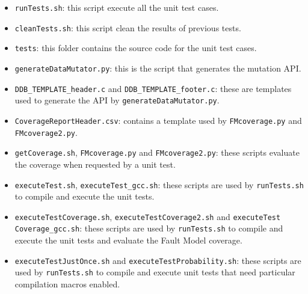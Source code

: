 \begin{itemize}
{\begin{itemize}
\begin{itemize}
\begin{itemize}
			\item \texttt{runTests.sh}: this script execute all the unit test cases.
			\item \texttt{cleanTests.sh}: this script clean the results of previous tests.
			\item \texttt{tests}: this folder contains the source code for the unit test cases.
			\item \texttt{generateDataMutator.py}: this is the script that generates the \DAMA mutation API.
			\item \texttt{DDB\_TEMPLATE\_header.c} and \texttt{DDB\_TEMPLATE\_footer.c}: these are templates used to generate the \DAMA API by \texttt{generateDataMutator.py}.
			\item \texttt{CoverageReportHeader.csv}: contains a template used by \texttt{FMcoverage.py} and \texttt{FMcoverage2.py}.
			\item \texttt{getCoverage.sh}, \texttt{FMcoverage.py} and \texttt{FMcoverage2.py}: these scripts evaluate the coverage when requested by a unit test.
			\item \texttt{executeTest.sh}, \texttt{executeTest\_gcc.sh}: these scripts are used by \texttt{runTests.sh} to compile and execute the unit tests.
			\item \texttt{executeTestCoverage.sh}, \texttt{executeTestCoverage2.sh} and  \texttt{execute}\texttt{Test}
			\texttt{Coverage}\texttt{\_gcc.sh}: these scripts are used by \texttt{runTests.sh} to compile and execute the unit tests and evaluate the Fault Model coverage.
			\item \texttt{executeTestJustOnce.sh} and \texttt{executeTestProbability.sh}: these scripts are used by \texttt{runTests.sh} to compile and execute unit tests that need particular compilation macros enabled.
		\end{itemize}%
	\end{itemize}%
\end{itemize}%
}


\end{itemize}
